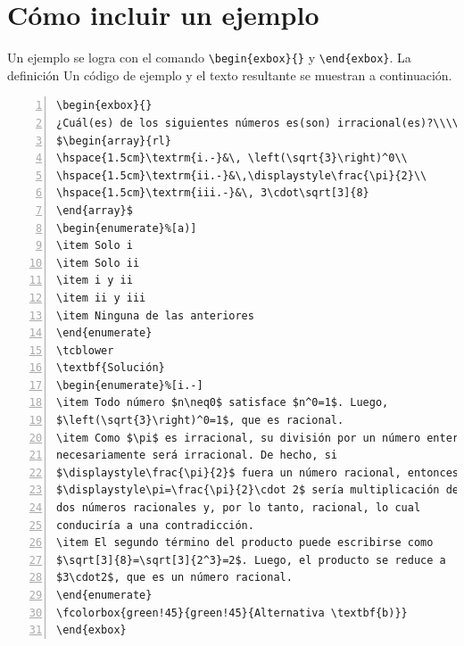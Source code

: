 \documentclass[11pt,letterpaper,twoside]{report}%
\begin{document}
\section{Cómo incluir un ejemplo}\label{sec:ejemplo}

Un ejemplo se logra con el comando \verb|\begin{exbox}{}| y \verb|\end{exbox}|. La definición Un código de ejemplo y el texto resultante se muestran a continuación.

\begin{Verbatim}[frame=single,framesep=5mm,rulecolor=\color{gray},numbers=left,numbersep=-10pt]
\begin{exbox}{}
¿Cuál(es) de los siguientes números es(son) irracional(es)?\\\\
$\begin{array}{rl}
\hspace{1.5cm}\textrm{i.-}&\, \left(\sqrt{3}\right)^0\\
\hspace{1.5cm}\textrm{ii.-}&\,\displaystyle\frac{\pi}{2}\\
\hspace{1.5cm}\textrm{iii.-}&\, 3\cdot\sqrt[3]{8}
\end{array}$
\begin{enumerate}%[a)]
\item Solo i
\item Solo ii
\item i y ii
\item ii y iii
\item Ninguna de las anteriores
\end{enumerate}
\tcblower
\textbf{Solución}
\begin{enumerate}%[i.-]
\item Todo número $n\neq0$ satisface $n^0=1$. Luego, 
$\left(\sqrt{3}\right)^0=1$, que es racional.
\item Como $\pi$ es irracional, su división por un número entero
necesariamente será irracional. De hecho, si 
$\displaystyle\frac{\pi}{2}$ fuera un número racional, entonces
$\displaystyle\pi=\frac{\pi}{2}\cdot 2$ sería multiplicación de
dos números racionales y, por lo tanto, racional, lo cual 
conduciría a una contradicción.
\item El segundo término del producto puede escribirse como 
$\sqrt[3]{8}=\sqrt[3]{2^3}=2$. Luego, el producto se reduce a 
$3\cdot2$, que es un número racional.
\end{enumerate}
\fcolorbox{green!45}{green!45}{Alternativa \textbf{b)}}
\end{exbox}
\end{Verbatim}
\end{document}
